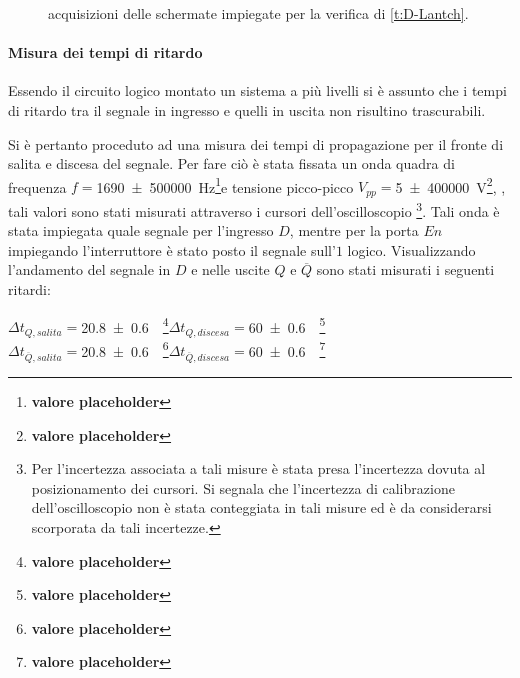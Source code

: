\documentclass[a4paper,11pt]{article}
\newcommand{\p}{\footnote{\textbf{valore placeholder}}}
\begin{document}
\begin{figure}[htb]
{		\label{f:sci2}
	}
		\caption{acquisizioni delle schermate impiegate per la verifica di \tablename{ \ref{t:D-Lantch}}.}
		\label{o:D-Latch}
	\end{figure}
\paragraph{Misura dei tempi di ritardo}
	Essendo il circuito logico montato un sistema a più livelli
	si è assunto che i tempi di ritardo tra il segnale in ingresso e quelli in uscita non risultino trascurabili.
	
	Si è pertanto proceduto ad una misura dei tempi di propagazione per il fronte di salita e discesa del segnale.
	Per fare ciò è stata fissata un onda quadra di frequenza $f=$\SI{1690\pm 500000}{\hertz}\p  e tensione picco-picco $V_{pp}=$\SI{5 \pm 400000}{\volt}\p,
	, tali valori sono stati misurati attraverso i cursori dell'oscilloscopio
	\footnote{Per l'incertezza associata a tali misure è stata presa l'incertezza dovuta al posizionamento dei cursori. Si segnala che l'incertezza di calibrazione dell'oscilloscopio non è stata conteggiata in tali misure ed è da considerarsi scorporata da tali incertezze. }.
	Tali onda è stata impiegata quale  segnale per l'ingresso $D$, mentre per la porta $En$ impiegando l'interruttore è stato posto il segnale sull'$1$ logico.
	Visualizzando l'andamento del segnale in $D$ e nelle uscite $Q$ e $\overline{Q}$
	sono stati misurati i seguenti ritardi:\\
	\begin{center}
		$ \Delta t_{Q,salita}=$\SI{20.8 \pm 0.6}{\nano \sec}\p \qquad $ \Delta t_{Q,discesa}=$\SI{60 \pm 0.6}{\nano \sec}\p\\
			$ \Delta t_{\overline{Q},salita}=$\SI{20.8 \pm 0.6}{\nano \sec}\p \qquad $ \Delta t_{\overline{Q},discesa}=$\SI{60 \pm 0.6}{\nano \sec}\p\\
	\end{center}
	
\end{document}
